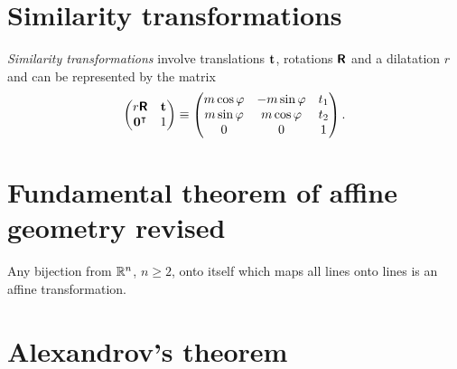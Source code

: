 \section{Similarity transformations}

{\em Similarity transformations}  involve translations ${\bf t}$, rotations $\textsf{\textbf{R}}$ and a dilatation $r$
and can be represented by the matrix
\begin{equation}
\begin{pmatrix}
r \textsf{\textbf{R}}&{\bf t}\\
{\bf 0}^\intercal &1
\end{pmatrix}
\equiv
\begin{pmatrix}
m\cos \varphi &-m\sin \varphi &{t}_1\\
m\sin \varphi &m\cos \varphi &{t}_2\\
0&0&1
\end{pmatrix}
.
\end{equation}




\section{Fundamental theorem of affine geometry revised}

Any bijection from ${\Bbb R}^n$, $n\ge 2$,  onto itself
which maps all lines onto lines is an affine transformation.



\section{Alexandrov's theorem}

